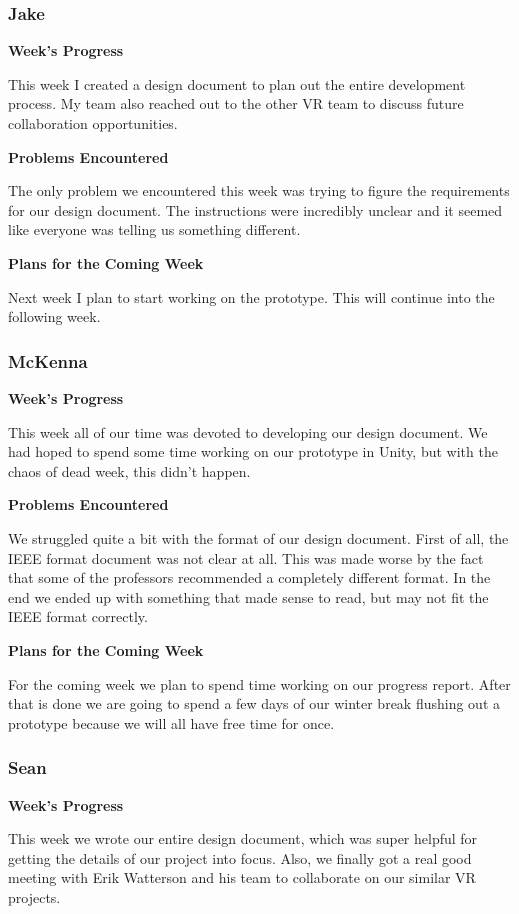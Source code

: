 \documentclass[10pt,journal,compsoc,onecolumn, draftclsnofoot]{IEEEtran}
\begin{document}
\subsubsection{Jake}
\noindent \textbf{Week's Progress}

This week I created a design document to plan out the entire development process. My team also reached out to the other VR team to discuss future collaboration opportunities.

\noindent \textbf{Problems Encountered}

The only problem we encountered this week was trying to figure the requirements for our design document. The instructions were incredibly unclear and it seemed like everyone was telling us something different.

\noindent \textbf{Plans for the Coming Week}

Next week I plan to start working on the prototype. This will continue into the following week.

\subsubsection{McKenna}
\noindent \textbf{Week's Progress}

This week all of our time was devoted to developing our design document. We had hoped to spend some time working on our prototype in Unity, but with the chaos of dead week, this didn't happen.

\noindent \textbf{Problems Encountered}

We struggled quite a bit with the format of our design document. First of all, the IEEE format document was not clear at all. This was made worse by the fact that some of the professors recommended a completely different format. In the end we ended up with something that made sense to read, but may not fit the IEEE format correctly.

\noindent \textbf{Plans for the Coming Week}

For the coming week we plan to spend time working on our progress report. After that is done we are going to spend a few days of our winter break flushing out a prototype because we will all have free time for once.

\subsubsection{Sean}
\noindent \textbf{Week's Progress}

This week we wrote our entire design document, which was super helpful for getting the details of our project into focus. Also, we finally got a real good meeting with Erik Watterson and his team to collaborate on our similar VR projects.
\end{document}
